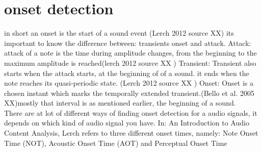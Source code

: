 \section{onset detection}
in short an onset is the start of a sound event (Lerch 2012 source XX)
its important to know the difference between: transients onset and attack. 
Attack: attack of a note is the time during amplitude changes, from the beginning to the maximum amplitude is reached(lerch 2012 source XX )
Transient: Transient also starts when the attack starts, at the beginning of of a sound. it ends when the note reaches its quasi-periodic state. (Lerch 2012 source XX )
Onset: Onset is a chosen instant which marks the temporally extended transient.(Bello et al. 2005 XX)mostly that interval is as mentioned earlier, the beginning of a sound. 
\\

There are at lot of different ways of  finding onset detection for a audio signals, it depends on which kind of audio signal you have.
In: An Introduction to Audio Content Analysis, Lerch refers to three different onset times, namely: Note Onset Time (NOT), Acoustic Onset Time (AOT) and Perceptual Onset Time 

